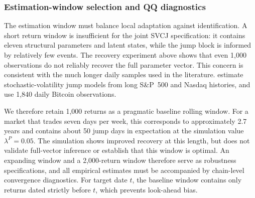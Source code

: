 \subsubsection{Estimation-window selection and QQ diagnostics}
\label{subsubsec:p_window_selection}

The estimation window must balance local adaptation against identification.
A short return window is insufficient for the joint SVCJ specification: it
contains eleven structural parameters and latent states, while the jump block
is informed by relatively few events.  The recovery experiment above shows
that even 1,000 observations do not reliably recover the full parameter vector.
This concern is consistent with the much longer daily samples used in the
literature. \citet{ErakerJohannesPolson2003}
estimate stochastic-volatility jump models from long S\&P~500 and Nasdaq
histories, and \citet{ChaimLaurini2018} use 1,840 daily Bitcoin observations.

We therefore retain 1,000 returns as a pragmatic baseline rolling window. For a market
that trades seven days per week, this corresponds to approximately 2.7 years
and contains about 50 jump days in expectation at the simulation value
$\lambda^P=0.05$. The simulation shows improved recovery at this length, but
does not validate full-vector inference or establish that this window is
optimal. An expanding window and a 2,000-return window therefore
serve as robustness specifications, and all empirical estimates must be
accompanied by chain-level convergence diagnostics. For target date $t$, the
baseline window contains only returns dated strictly before $t$, which
prevents look-ahead bias.

